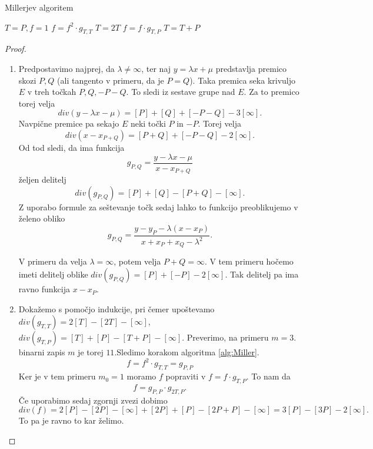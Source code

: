 \documentclass[12pt,a4paper,twoside]{article}
\theoremstyle{definition} %
\theoremstyle{plain} %
\numberwithin{equation}{section}  %
\begin{document}
\begin{algorithm}[H]
\caption[Miller]{Millerjev algoritem}
\label{alg:Miller}

\begin{algorithmic}
\State $T = P,f = 1$
	\State $f = f^2 \cdot g_{T,T}$
	\State $T = 2T$
		\State $f = f \cdot g_{T,P}$
		\State $T=T+P$
	\EndIf
	
\EndFor

\end{algorithmic}
\end{algorithm}

\begin{proof}
\begin{enumerate}
\item Predpostavimo najprej, da $\lambda \neq \infty$, ter naj $y = \lambda x + \mu$ predstavlja premico skozi $P,Q$ (ali tangento v primeru, da je $P=Q$). Taka premica seka krivuljo $E$ v treh točkah $P,Q,-P-Q$. To sledi iz sestave grupe nad $E$. Za to premico torej velja
$$div(y-\lambda x - \mu) = [P] + [Q] + [-P-Q] - 3[\infty].$$
Navpične premice pa sekajo $E$ neki točki $P$ in $-P$. Torej velja
$$div(x-x_{P+Q}) = [P+Q] + [-P-Q] - 2[\infty].$$
Od tod sledi, da ima funkcija
$$g_{P,Q} =\frac{y-\lambda x - \mu}{x-x_{P+Q}}$$
željen delitelj
$$div(g_{P,Q}) = [P] + [Q] - [P+Q] - [\infty].$$
Z uporabo formule za seštevanje točk sedaj lahko to funkcijo preoblikujemo v želeno obliko
$$g_{P,Q} = \frac{y-y_P-\lambda(x-x_P)}{x+x_P+x_Q-\lambda^2} .$$

V primeru da velja $\lambda = \infty$, potem velja $P+Q = \infty$. V tem primeru hočemo imeti delitelj oblike $div(g_{P,Q}) = [P] + [-P] - 2[\infty]$. Tak delitelj pa ima ravno funkcija $x-x_P$.

\item Dokažemo s pomočjo indukcije, pri čemer upoštevamo $div(g_{T,T}) = 2[T]-[2T]-[\infty]$, $div(g_{T,P}) = [T]+[P]-[T+P]-[\infty]$.
Preverimo, na primeru $m = 3$. binarni zapis $m$ je torej $11$.Sledimo korakom algoritma \ref{alg:Miller}.
$$f = f^2 \cdot g_{T,T} = g_{P,P}$$
Ker je v tem primeru $m_0 = 1$ moramo $f$ popraviti v $f = f \cdot g_{T,P}$. To nam da
$$f = g_{P,P} \cdot g_{2T,P}.$$
Če uporabimo sedaj zgornji zvezi dobimo
$$div(f) = 2[P] - [2P] - [\infty] + [2P] + [P] - [2P+P] - [\infty] = 3[P] - [3P]-2[\infty].$$
To pa je ravno to kar želimo.

\end{enumerate}

\end{proof}
\end{document}
